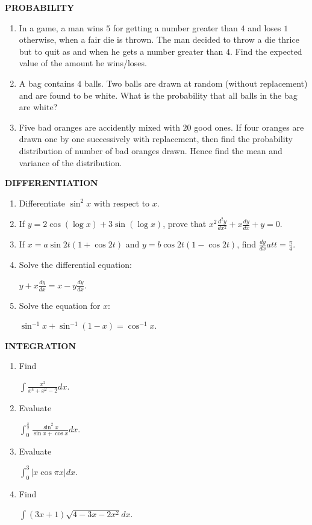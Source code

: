 \documentclass[12pt,-letter paper]{article}
\begin{document}
\begin{center}
	\textbf{PROBABILITY}
\end{center}
\begin{enumerate}
\item In a game, a man wins \rupee$5$ for getting a number greater than $4$ and loses \rupee$1$ otherwise, when a fair die is thrown. The man decided to throw a die thrice but to quit as and when he gets a number greater than $4$. Find the expected value of the amount he wins/loses. 
\item A bag contains $4$ balls. Two balls are drawn at random (without replacement) and are found to be white. What is the probability that all balls in the bag are white?
\item Five bad oranges are accidently mixed with $20$ good ones. If four oranges are drawn one by one successively with replacement, then find the probability distribution of number of bad oranges drawn. Hence find the mean and variance of the distribution.
\end{enumerate}
\begin{center}
	\textbf{DIFFERENTIATION}
\end{center}
\begin{enumerate}
\item Differentiate $\sin^2 x$ with respect to $x$. 
\item If  $y=2\cos(\log x)+3\sin(\log x)$, prove that $x^2\frac{d^2y}{dx^2}+x\frac{dy}{dx}+y=0$. 
\item If $x=a\sin 2t(1+\cos 2t)$ and $y=b\cos 2t(1-\cos 2t)$, find $\frac{dy}{dx} at t=\frac{\pi}{4}$.
\item Solve the differential equation:


$y+x\frac{dy}{dx}=x-y\frac{dy}{dx}$.


\item Solve the equation for $x$:


	$\sin^{-1}x+\sin^{-1}(1-x)=\cos^{-1}x$.
\end{enumerate}
\begin{center}
	\textbf{INTEGRATION}
\end{center}
\begin{enumerate}
\item Find 


	$\int\frac{x^2}{x^4+x^2-2}dx$. 


\item Evaluate 


	$\int_{0}^{\frac{\pi}{2}}\frac{\sin^2x}{\sin x+\cos x}dx$. 

\item Evaluate 


	$\int_{0}^{3}|x\cos \pi x|dx$. 


\item Find



	$\int(3x+1)\sqrt{4-3x-2x^2}dx$.


\end{enumerate}
\end{document}

